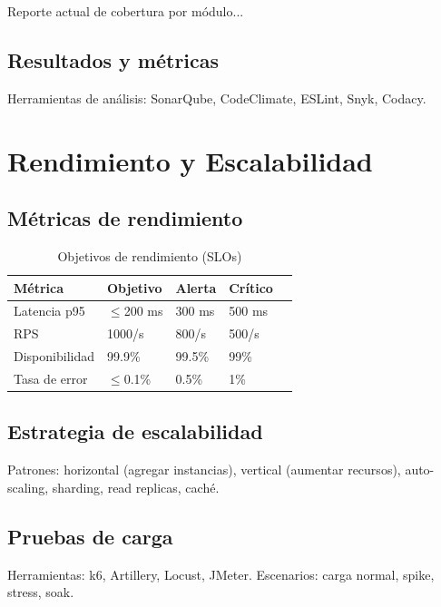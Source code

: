 \documentclass[a4paper,11pt,spanish]{article}
\begin{document}
Reporte actual de cobertura por módulo...

\subsection{Resultados y métricas}

Herramientas de análisis: SonarQube, CodeClimate, ESLint, Snyk, Codacy.

\newpage

\section{Rendimiento y Escalabilidad}

\subsection{Métricas de rendimiento}

\begin{table}[H]
\centering
\caption{Objetivos de rendimiento (SLOs)}
\label{tab:slo}
\begin{tabular}{@{}lllll@{}}
\toprule
\textbf{Métrica} & \textbf{Objetivo} & \textbf{Alerta} & \textbf{Crítico} \\
\midrule
Latencia p95 & $\le$200 ms & 300 ms & 500 ms \\
RPS & 1000/s & 800/s & 500/s \\
Disponibilidad & 99.9\% & 99.5\% & 99\% \\
Tasa de error & $\le$0.1\% & 0.5\% & 1\% \\
\bottomrule
\end{tabular}
\end{table}

\subsection{Estrategia de escalabilidad}

Patrones: horizontal (agregar instancias), vertical (aumentar recursos), auto-scaling, sharding, read replicas, caché.

\subsection{Pruebas de carga}

Herramientas: k6, Artillery, Locust, JMeter. Escenarios: carga normal, spike, stress, soak.

\vspace{1em}
\end{document}
